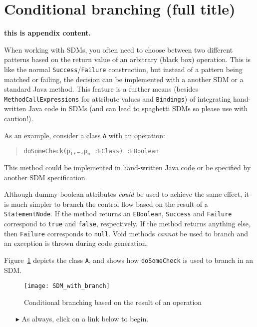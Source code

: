 \newpage
\section{Conditional branching (full title)}
\genHeader
\hypertarget{sec:conBran}{}

{\bf \large this is appendix content.}

When working with SDMs, you often need to choose between two different patterns based on the return value of an arbitrary (black box) operation.
This is like the normal \texttt{Success}/\texttt{Failure} construction, but instead of a pattern being matched or failing, the decision can be implemented with
a another SDM or a standard Java method. This feature is a further means (besides \texttt{MethodCallExpressions} for attribute values and \texttt{Bindings}) of
integrating hand-written Java code in SDMs (and can lead to spaghetti SDMs so please use with caution!).

As an example, consider a class \texttt{A} with an operation:
\begin{quote}
 \mbox{\texttt{doSomeCheck(p$_1$,\ldots,p$_n$ :EClass) :EBoolean}}
\end{quote}

This method could be implemented in hand-written Java code or be specified by another SDM specification.

Although dummy boolean attributes \emph{could} be used to achieve the same effect, it is much simpler to branch the control flow based on the result of a \texttt{StatementNode}.
If the method returns an \texttt{EBoolean}, \texttt{Success} and \texttt{Failure} correspond to \texttt{true} and \texttt{false}, respectively. If the method returns anything else, then \texttt{Failure} corresponds to \texttt{null}. Void methods \emph{cannot} be used to branch and an exception is thrown during code generation.

Figure~\ref{fig:cond_branch_on_op} depicts the class \texttt{A}, and shows how \texttt{doSomeCheck} is used to branch in an SDM.

\begin{figure}[htp]
\begin{center}
  \texttt{[image: SDM\_with\_branch]}
  \caption{Conditional branching based on the result of an operation}
  \label{fig:cond_branch_on_op}
\end{center}
\end{figure}

\vspace{0.5cm}
\begin{itemize}
\item[$\blacktriangleright$] As always, click on a link below to begin.
\end{itemize}

